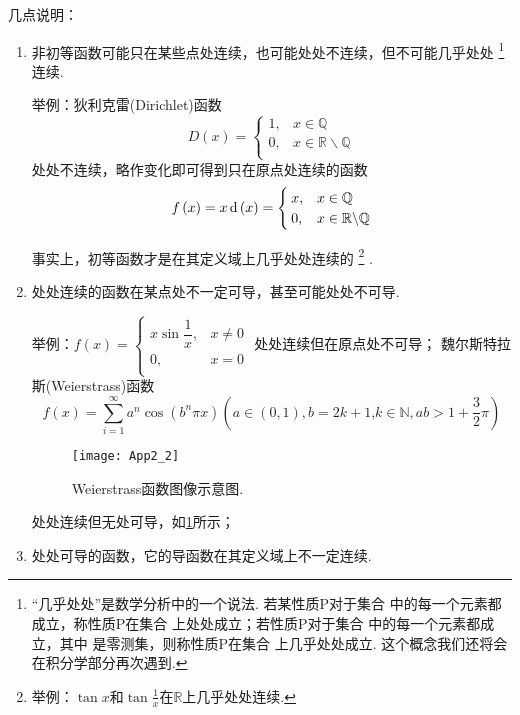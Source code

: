     几点说明：
    \begin{enumerate}[label={(\arabic*)}]
      \item  非初等函数可能只在某些点处连续，也可能处处不连续，但不可能几乎处处
      \footnote{“几乎处处”是数学分析中的一个说法. 若某性质P对于集合 中的每一个元素都成立，称性质P在集合 上处处成立；若性质P对于集合 中的每一个元素都成立，其中 是零测集，则称性质P在集合 上几乎处处成立. 这个概念我们还将会在积分学部分再次遇到.}
       连续.

      举例：狄利克雷(Dirichlet)函数
      \[ D\left( x \right) =\begin{cases}
        \text{1,}&    x\in \mathbb{Q}\\
        0, &    x\in \mathbb{R}\backslash\mathbb{Q}\\
      \end{cases} \]
      处处不连续，略作变化即可得到只在原点处连续的函数
      $$f\left( x \right) =x\operatorname{\mathop{}\!\mathrm{d}} \left( x \right) =\begin{cases}
        x,&   x\in \mathbb{Q}\\
        0, &    x\in \mathbb{R}\backslash\mathbb{Q}\\
      \end{cases}$$

      事实上，初等函数才是在其定义域上几乎处处连续的
      \footnote{举例：$\tan x$和$\tan \frac{1}{x}$在$\mathbb{R}$上几乎处处连续.}
      .

      \item 处处连续的函数在某点处不一定可导，甚至可能处处不可导.

      举例：$f\left( x \right) =
      \begin{cases}
        x\sin \dfrac{1}{x}, & x \ne 0\\
        0, & x=0 \\
      \end{cases}$
      处处连续但在原点处不可导；
      魏尔斯特拉斯(Weierstrass)函数
      $$f\left( x \right) =\sum_{i=1}^{\infty}{a^n\cos \left( b^n\pi x \right)}\left( a\in \left( 0, 1 \right) ,b=2k+\text{1,}k\in \mathbb{N},ab>1+\frac{3}{2}\pi \right) $$
      \begin{figure}[!h]
        \centering
        \texttt{[image: App2\_2]}
        \caption{Weierstrass函数图像示意图.}\label{fig:Weierstrass函数图像示意图.}
      \end{figure}
      处处连续但无处可导，如\ref{fig:Weierstrass函数图像示意图.}所示；

      \item 处处可导的函数，它的导函数在其定义域上不一定连续.


\end{enumerate}
